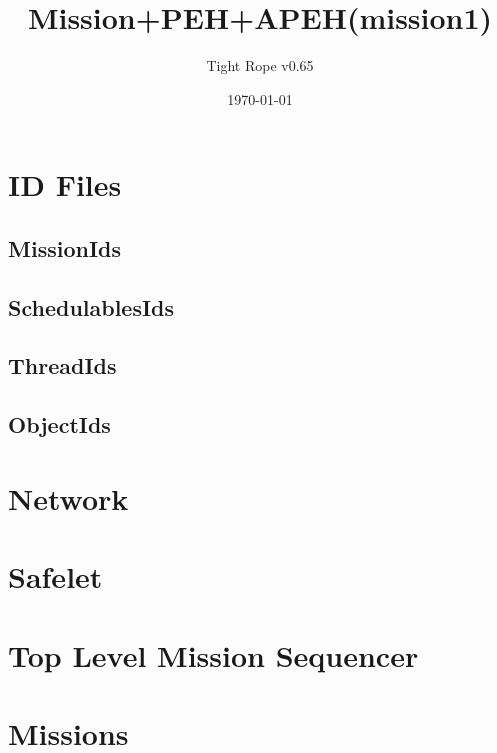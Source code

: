 \documentclass[10pt,a4paper]{article}
\title{Mission+PEH+APEH(mission1)}
\author{Tight Rope v0.65}
\date{\today}
\begin{document}
\maketitle

\section{ID Files}
\subsection{MissionIds}

\newpage

\subsection{SchedulablesIds}

\newpage

\subsection{ThreadIds}

\newpage

\subsection{ObjectIds}

\newpage

\section{Network}

\newpage


\section{Safelet}

\newpage
{}
\newpage

\section{Top Level Mission Sequencer}

\newpage
{}
\newpage

\section{Missions}
\end{document}
